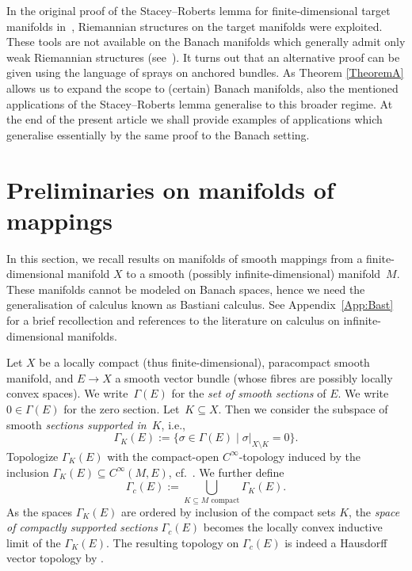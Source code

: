 \documentclass[pdftex]{sigma}
\numberwithin{equation}{section}
\newtheorem{setup}[Theorem]{}
\begin{document}
In the original proof of the Stacey--Roberts lemma for finite-dimensional target manifolds in~\cite{AaS19}, Riemannian structures on the target manifolds were exploited. These tools are not available on the Banach manifolds which generally admit only weak Riemannian structures (see~\cite{Sch23}). It turns out that an alternative proof can be given using the language of sprays on anchored bundles. As Theorem \ref{TheoremA} allows us to expand the scope to (certain) Banach manifolds, also the mentioned applications of the Stacey--Roberts lemma generalise to this broader regime. At the end of the present article we shall provide examples of applications which generalise essentially by the same proof to the Banach setting.

\section{Preliminaries on manifolds of mappings}
In this section, we recall results on manifolds of smooth mappings from a finite-dimensional manifold $X$ to a smooth (possibly infinite-dimensional) manifold~$M$. These manifolds cannot be modeled on Banach spaces, hence we need the generalisation of calculus known as Bastiani calculus. See Appendix~\ref{App:Bast}
for a brief recollection and references to the literature on calculus on infinite-dimensional manifolds.

Let $X$ be a locally compact (thus finite-dimensional), paracompact smooth manifold, and ${E \rightarrow X}$ a smooth vector bundle (whose fibres are possibly locally convex spaces).
We write~$\Gamma(E)$ for the \emph{set of smooth sections} of $E$.
We write $0 \in \Gamma(E)$ for the zero section.
Let~${K \subseteq X}$.
Then we consider the subspace of smooth \emph{sections supported in}~$K$, i.e.,
\begin{displaymath}
 \Gamma_{K}(E) := \bigl\{ \sigma \in \Gamma(E) \mid \sigma|_{X \setminus K} = 0 \bigr\}.
\end{displaymath}
Topologize $\Gamma_K(E)$ with the compact-open $C^{\infty}$-topology induced by the inclusion $\Gamma_K(E) \subseteq C^{\infty}(M,E)$, cf.\ \cite{HaS17}.
We further define
\begin{displaymath}
 \Gamma_c (E) := \bigcup_{K \subseteq M \text{ compact}} \Gamma_K (E).
\end{displaymath}
As the spaces $\Gamma_K(E)$ are ordered by inclusion of the compact sets $K$, the \emph{space of compactly supported sections} $\Gamma_c(E)$ becomes the locally convex inductive limit of the $\Gamma_K(E)$. The resulting topology on $\Gamma_c(E)$ is indeed a Hausdorff vector topology by \cite[Lemma F.19\,(c)]{glo04}.
\end{document}
